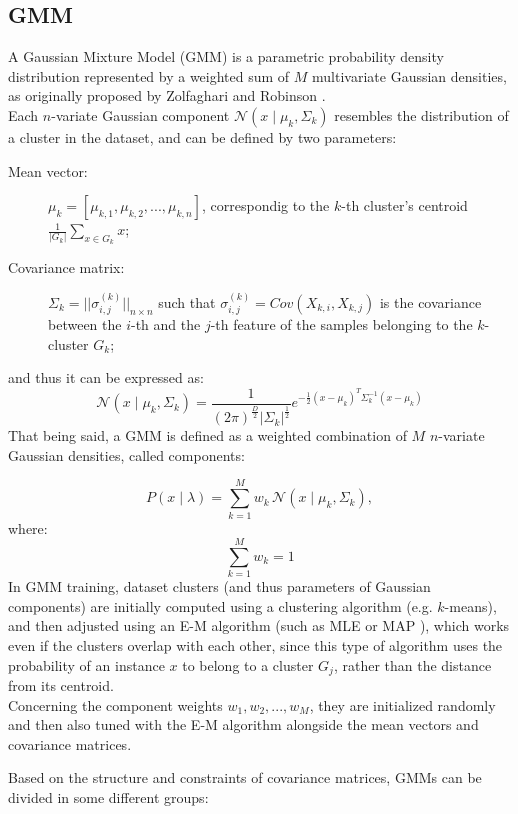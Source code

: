 \subsection{GMM}

A Gaussian Mixture Model (GMM) is a parametric probability density distribution represented by a weighted sum of $M$ multivariate Gaussian densities, as originally proposed by Zolfaghari and Robinson \cite{c10}.
\\Each $n$-variate Gaussian component $\mathcal{N}\left(x \mid \mu_{k}, \Sigma_{k}\right)$ resembles the distribution of a cluster in the dataset, and can be defined by two parameters:

\begin{description}
    \item[Mean vector:] $\mu_k = [\mu_{k, 1}, \mu_{k, 2}, ..., \mu_{k, n}]$, correspondig to the $k$-th cluster's centroid $\frac{1}{|G_k|}\sum_{x \in G_k} x$;
    
    \item[Covariance matrix:] $\Sigma_k = ||\sigma^{(k)}_{i, j}||_{n \times n} $ such that $\sigma^{(k)}_{i, j} = Cov(X_{k, i}, X_{k, j})$ is the covariance between the $i$-th and the $j$-th feature of the samples belonging to the $k$-cluster $G_k$;
\end{description}
and thus it can be expressed as:
$$
\mathcal{N}\left(x \mid \mu_{k}, \Sigma_{k}\right)=\frac{1}{(2 \pi)^{\frac{D}{2}}\left|\Sigma_{k}\right|^{\frac{1}{2}}} e^{-\frac{1}{2}\left(x-\mu_{k}\right)^{T} \Sigma_{k}^{-1}\left(x-\mu_{k}\right)}
$$
That being said, a GMM is defined as a weighted combination of $M$ $n$-variate Gaussian densities, called components:

$$
P(x \mid \lambda)=\sum_{k=1}^{M} w_{k} \, \mathcal{N}\left(x \mid \mu_{k}, \Sigma_{k}\right),
$$
where:
$$
\sum_{k=1}^{M} w_{k}=1
$$
In GMM training, dataset clusters (and thus parameters of Gaussian components) are initially computed using a clustering algorithm (e.g. $k$-means), and then adjusted using an E-M algorithm (such as MLE \cite{mlegmm} or MAP \cite{mapgmm}), which works even if the clusters overlap with each other, since this type of algorithm uses the probability of an instance $x$ to belong to a cluster $G_j$, rather than the distance from its centroid.
\\Concerning the component weights $w_1, w_2, ..., w_M$, they are initialized randomly and then also tuned with the E-M algorithm alongside the mean vectors and covariance matrices.

Based on the structure and constraints of covariance matrices, GMMs can be divided in some different groups:

